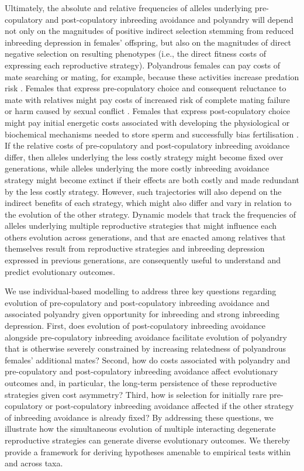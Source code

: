 \documentclass[12pt]{article}
\begin{document}
Ultimately, the absolute and relative frequencies of alleles underlying pre-copulatory and post-copulatory inbreeding avoidance and polyandry will depend not only on the magnitudes of positive indirect selection stemming from reduced inbreeding depression in females' offspring, but also on the magnitudes of direct negative selection on resulting phenotypes (i.e., the direct fitness costs of expressing each reproductive strategy). Polyandrous females can pay costs of mate searching or mating, for example, because these activities increase predation risk \cite[e.g.,][]{Rowe1988, Ronkainen1994, Koga1998}. Females that express pre-copulatory choice and consequent reluctance to mate with relatives might pay costs of increased risk of complete mating failure or harm caused by sexual conflict \cite[][]{Rowe1994, Kokko2013}. Females that express post-copulatory choice might pay initial energetic costs associated with developing the physiological or biochemical mechanisms needed to store sperm and successfully bias fertilisation \cite[e.g.,][]{Gasparini2011, Tuni2013, Fitzpatrick2014b}. If the relative costs of pre-copulatory and post-copulatory inbreeding avoidance differ, then alleles underlying the less costly strategy might become fixed over generations, while alleles underlying the more costly inbreeding avoidance strategy might become extinct if their effects are both costly and made redundant by the less costly strategy. However, such trajectories will also depend on the indirect benefits of each strategy, which might also differ and vary in relation to the evolution of the other strategy. Dynamic models that track the frequencies of alleles underlying multiple reproductive strategies that might influence each others evolution across generations, and that are enacted among relatives that themselves result from reproductive strategies and inbreeding depression expressed in previous generations, are consequently useful to understand and predict evolutionary outcomes.

We use individual-based modelling to address three key questions regarding evolution of pre-copulatory and post-copulatory inbreeding avoidance and associated polyandry given opportunity for inbreeding and strong inbreeding depression. First, does evolution of post-copulatory inbreeding avoidance alongside pre-copulatory inbreeding avoidance facilitate evolution of polyandry that is otherwise severely constrained by increasing relatedness of polyandrous females' additional mates? Second, how do costs associated with polyandry and pre-copulatory and post-copulatory inbreeding avoidance affect evolutionary outcomes and, in particular, the long-term persistence of these reproductive strategies given cost asymmetry? Third, how is selection for initially rare pre-copulatory or post-copulatory inbreeding avoidance affected if the other strategy of inbreeding avoidance is already fixed? By addressing these questions, we illustrate how the simultaneous evolution of multiple interacting degenerate reproductive strategies can generate diverse evolutionary outcomes. We thereby provide a framework for deriving hypotheses amenable to empirical tests within and across taxa.
\end{document}
